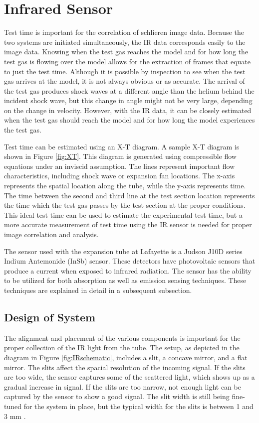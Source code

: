 \section{Infrared Sensor}

Test time is important for the correlation of schlieren image data. Because the two systems are initiated simultaneously, the IR data corresponds easily to the image data. Knowing when the test gas reaches the model and for how long the test gas is flowing over the model allows for the extraction of frames that equate to just the test time. Although it is possible by inspection to see when the test gas arrives at the model, it is not always obvious or as accurate. The arrival of the test gas produces shock waves at a different angle than the helium behind the incident shock wave, but this change in angle might not be very large, depending on the change in velocity. However, with the IR data, it can be closely estimated when the test gas should reach the model and for how long the model experiences the test gas. 

Test time can be estimated using an X-T diagram. A sample X-T diagram is shown in Figure \ref{fig:XT}. This diagram is generated using compressible flow equations under an inviscid assumption. The lines represent important flow characteristics, including shock wave or expansion fan locations. The x-axis represents the spatial location along the tube, while the y-axis represents time. The time between the second and third line at the test section location represents the time which the test gas passes by the test section at the proper conditions. This ideal test time can be used to estimate the experimental test time, but a more accurate measurement of test time using the IR sensor is needed for proper image correlation and analysis.

The sensor used with the expansion tube at Lafayette is a Judson J10D series Indium Antemonide (InSb) sensor. These detectors have photovoltaic sensors that produce a current when exposed to infrared radiation. The sensor has the ability to be utilized for both absorption as well as emission sensing techniques. These techniques are explained in detail in a subsequent subsection.


\subsection{Design of System}
The alignment and placement of the various components is important for the proper collection of the IR light from the tube. The setup, as depicted in the diagram in Figure \ref{fig:IRschematic}, includes a slit, a concave mirror, and a flat mirror. The slits affect the spacial resolution of the incoming signal. If the slits are too wide, the sensor captures some of the scattered light, which shows up as a gradual increase in signal. If the slits are too narrow, not enough light can be captured by the sensor to show a good signal. The slit width is still being fine-tuned for the system in place, but the typical width for the slits is between 1 and 3 mm \cite{flower1976experimental}. 

